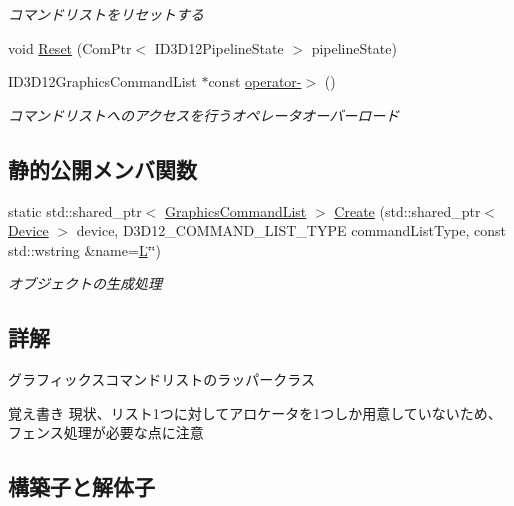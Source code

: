 \begin{DoxyCompactItemize}
\begin{DoxyCompactList}\small\item\em コマンドリストをリセットする \end{DoxyCompactList}\item 
void \mbox{\hyperlink{class_graphics_command_list_ae5f24d01a01bc1ffb30ffa9173f85722}{Reset}} (Com\+Ptr$<$ I\+D3\+D12\+Pipeline\+State $>$ pipeline\+State)
\item 
I\+D3\+D12\+Graphics\+Command\+List $\ast$const \mbox{\hyperlink{class_graphics_command_list_aa62a89b6eeaa4e4fd7bc32d97a2d7ab3}{operator-\/$>$}} ()
\begin{DoxyCompactList}\small\item\em コマンドリストへのアクセスを行うオペレータオーバーロード \end{DoxyCompactList}\end{DoxyCompactItemize}
\subsection*{静的公開メンバ関数}
\begin{DoxyCompactItemize}
\item 
static std\+::shared\+\_\+ptr$<$ \mbox{\hyperlink{class_graphics_command_list}{Graphics\+Command\+List}} $>$ \mbox{\hyperlink{class_graphics_command_list_aaf73581eb764f378b8b1b6d39385c584}{Create}} (std\+::shared\+\_\+ptr$<$ \mbox{\hyperlink{class_device}{Device}} $>$ device, D3\+D12\+\_\+\+C\+O\+M\+M\+A\+N\+D\+\_\+\+L\+I\+S\+T\+\_\+\+T\+Y\+PE command\+List\+Type, const std\+::wstring \&name=\mbox{\hyperlink{_keyboard_8h_a50f7749e42959062d6f7ee3df6a2fd93ad20caec3b48a1eef164cb4ca81ba2587}{L}}\char`\"{}\char`\"{})
\begin{DoxyCompactList}\small\item\em オブジェクトの生成処理 \end{DoxyCompactList}\end{DoxyCompactItemize}


\subsection{詳解}
グラフィックスコマンドリストのラッパークラス 

\begin{DoxyNote}{覚え書き}
現状、リスト1つに対してアロケータを1つしか用意していないため、 フェンス処理が必要な点に注意 
\end{DoxyNote}


\subsection{構築子と解体子}
\mbox{\label{class_graphics_command_list_aaf8ac2a05856c02eb36021561f5c90c5}} 
